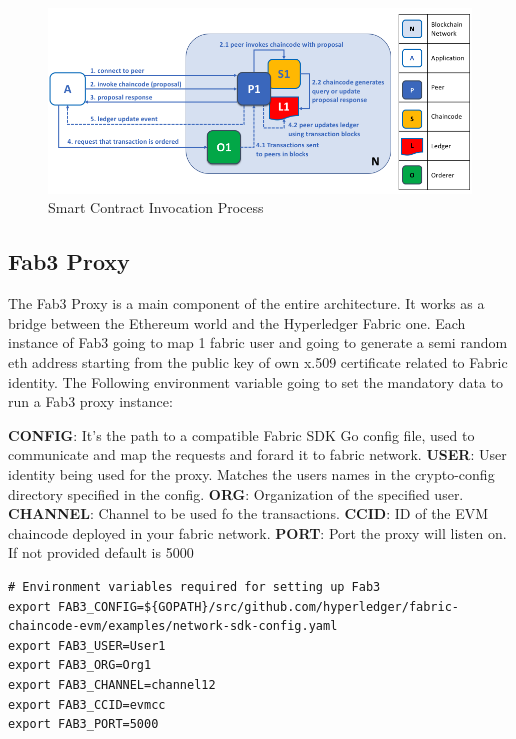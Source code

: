 \begin{figure}[h!]
    \centering
    \includegraphics[totalheight=6cm]{img/sc_invokation.png}
    \caption{Smart Contract Invocation Process}
    \label{fig:sc_invokation}
\end{figure}

\newpage
\subsection{Fab3 Proxy}

The Fab3 Proxy is a main component of the entire architecture. It works as a bridge between the Ethereum
world and the Hyperledger Fabric one. Each instance of Fab3 going to map 1 fabric user and going to 
generate a semi random eth address starting from the public key of own x.509 certificate related to
Fabric identity. 
The Following environment variable going to set the mandatory data to run a Fab3 proxy instance:

\begin{outline}
    \1 \textbf{CONFIG}: It's the path to a compatible Fabric SDK Go config file, used to communicate and map the requests and forard it to fabric network.
    \1 \textbf{USER}: User identity being used for the proxy. Matches the users names in the crypto-config directory specified in the config.
    \1 \textbf{ORG}: Organization of the specified user.
    \1 \textbf{CHANNEL}: Channel to be used fo the transactions.
    \1 \textbf{CCID}: ID of the EVM chaincode deployed in your fabric network.
    \1 \textbf{PORT}: Port the proxy will listen on. If not provided default is 5000
\end{outline}

\begin{lstlisting}
# Environment variables required for setting up Fab3
export FAB3_CONFIG=${GOPATH}/src/github.com/hyperledger/fabric-chaincode-evm/examples/network-sdk-config.yaml 
export FAB3_USER=User1 
export FAB3_ORG=Org1
export FAB3_CHANNEL=channel12 
export FAB3_CCID=evmcc
export FAB3_PORT=5000
\end{lstlisting}

